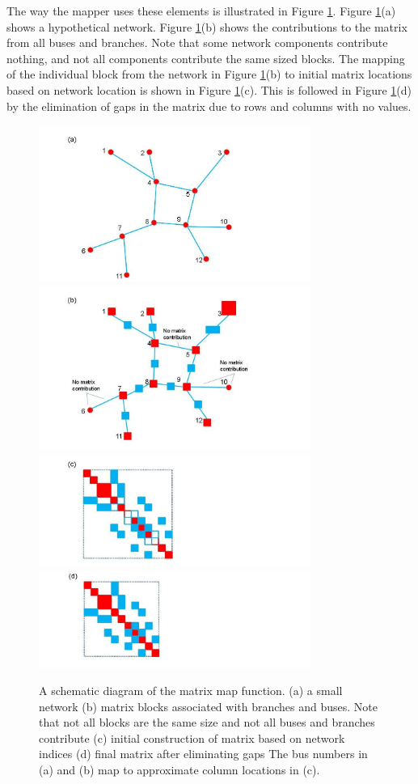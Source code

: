 \documentclass[preprint]{acm_proc_article-sp}
\begin{document}
The way the mapper uses these elements is illustrated in Figure
\ref{mapper}. Figure \ref{mapper}(a) shows a hypothetical network.
Figure \ref{mapper}(b) shows the contributions to the matrix from all buses
and branches. Note that some network components contribute nothing, and
not all components contribute the same sized blocks.  The mapping of the individual
block from the network in Figure \ref{mapper}(b) to initial matrix locations
based on network location is shown in Figure \ref{mapper}(c). This is followed
in Figure \ref{mapper}(d) by the elimination of gaps in the matrix due to rows
and columns with no values.
\begin{figure}
\centering
\includegraphics[width=3.5in,keepaspectratio=true]{./Fig4a}
\includegraphics[width=3.5in,keepaspectratio=true]{./Fig4b}
\includegraphics[width=3.5in,keepaspectratio=true]{./Fig4c}
\includegraphics[width=3.5in,keepaspectratio=true]{./Fig4d}
\caption{\label{mapper} A schematic diagram of the matrix map function.
(a) a small network (b)
matrix blocks associated with branches and buses. Note that not all blocks are
the same size and not all buses and branches contribute (c) initial construction
of matrix based on network indices (d) final matrix after eliminating gaps
The bus numbers in (a) and (b) map to approximate column locations in (c).}
\end{figure}
\end{document}
